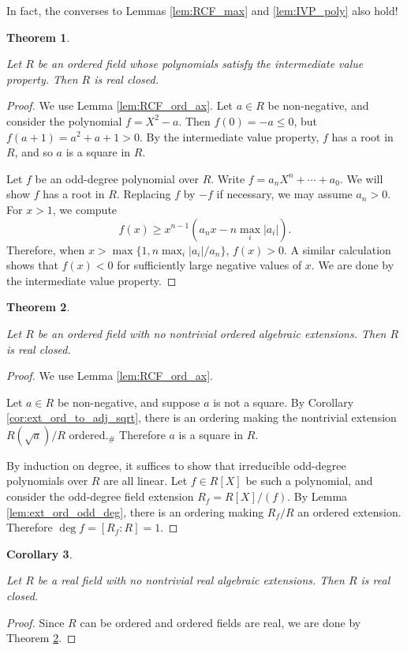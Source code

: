 \documentclass{article}
\newtheorem{theorem}{Theorem}[section]
\newtheorem{corollary}[theorem]{Corollary}
\newcommand{\leanok}{}
\newcommand{\lean}[1]{}
\newcommand{\uses}[1]{}
\begin{document}
In fact, the converses to Lemmas \ref{lem:RCF_max} and \ref{lem:IVP_poly} also hold!

\begin{theorem}
  \label{thm:IVP_poly_imp_RCF}
  \uses{def:RCF}
  \lean{IsRealClosed.of_ivp}
  \leanok
  Let $R$ be an ordered field whose polynomials satisfy the intermediate value property. Then $R$ is real closed.
\end{theorem}
\begin{proof}
  \uses{lem:RCF_ord_ax}
  \leanok
  We use Lemma \ref{lem:RCF_ord_ax}. Let $a\in R$ be non-negative, and consider the polynomial $f=X^2-a$. Then $f(0)=-a\leq0$, but $f(a+1)=a^2+a+1>0$. By the intermediate value property, $f$ has a root in $R$, and so $a$ is a square in $R$.

  Let $f$ be an odd-degree polynomial over $R$. Write $f=a_nX^n+\cdots+a_0$. We will show $f$ has a root in $R$. Replacing $f$ by $-f$ if necessary, we may assume $a_n>0$. For $x>1$, we compute
  \[f(x)\geq x^{n-1}(a_nx-n\max_i|a_i|).\]
  Therefore, when $x>\max\{1,n\max_i|a_i|/a_n\}$, $f(x)>0$. A similar calculation shows that $f(x)<0$ for sufficiently large negative values of $x$. We are done by the intermediate value property.
\end{proof}

\begin{theorem}
  \label{thm:ord_max_imp_RCF}
  \uses{def:RCF}
  \lean{IsRealClosed.of_bijective_algebraMap_of_isOrderedAlgebra}
  \leanok
  Let $R$ be an ordered field with no nontrivial ordered algebraic extensions. Then $R$ is real closed.
\end{theorem}
\begin{proof}
  \uses{lem:RCF_ord_ax,cor:ext_ord_to_adj_sqrt,lem:ext_ord_odd_deg}
  \leanok
  We use Lemma \ref{lem:RCF_ord_ax}.

  Let $a\in R$ be non-negative, and suppose $a$ is not a square. By Corollary \ref{cor:ext_ord_to_adj_sqrt}, there is an ordering making the nontrivial extension $R(\sqrt{a})/R$ ordered.$_\#$ Therefore $a$ is a square in $R$.

  By induction on degree, it suffices to show that irreducible odd-degree polynomials over $R$ are all linear. Let $f\in R[X]$ be such a polynomial, and consider the odd-degree field extension $R_f=R[X]/(f)$. By Lemma \ref{lem:ext_ord_odd_deg}, there is an ordering making $R_f/R$ an ordered extension. Therefore $\deg f=[R_f:R]=1$.
\end{proof}

\begin{corollary}
  \label{cor:real_max_imp_RCF}
  \uses{def:RCF}
  \lean{IsRealClosed.of_bijective_algebraMap_of_isSemireal}
  \leanok
  Let $R$ be a real field with no nontrivial real algebraic extensions. Then $R$ is real closed.
\end{corollary}
\begin{proof}
  \uses{thm:ord_iff_real,thm:ord_max_imp_RCF}
  \leanok
  Since $R$ can be ordered and ordered fields are real, we are done by Theorem \ref{thm:ord_max_imp_RCF}.
\end{proof}
\end{document}
